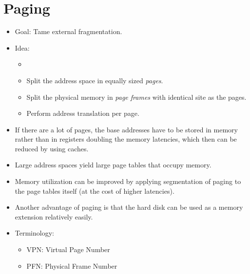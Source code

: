 	\section{Paging}
		\begin{itemize}
			\item Goal: Tame external fragmentation.
			\item Idea:
				\begin{itemize}
					\item
					\item Split the address space in equally sized \textit{pages}.
					\item Split the physical memory in \textit{page frames} with identical site as the pages.
					\item Perform address translation per page.
				\end{itemize}
			\item If there are a lot of pages, the base addresses have to be stored in memory rather than in registers doubling the memory latencies, which then can be reduced by using caches.
			\item Large address spaces yield large page tables that occupy memory.
			\item Memory utilization can be improved by applying segmentation of paging to the page tables itself (at the cost of higher latencies).
			\item Another advantage of paging is that the hard disk can be used as a memory extension relatively easily.
			\item Terminology:
				\begin{itemize}
					\item VPN: Virtual Page Number
					\item PFN: Physical Frame Number
				\end{itemize}
		\end{itemize}

